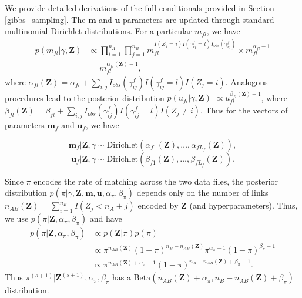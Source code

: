 \documentclass[ba]{imsart}
\begin{document}
We provide detailed derivations of the full-conditionals provided in Section \ref{gibbs_sampling}. The $\bm{m}$ and $\bm{u}$ parameters are updated through standard multinomial-Dirichlet distributions. For a particular $m_{fl}$, we have
\begin{align*}
	p(m_{fl}| \gamma, \bm{Z}) &\propto \prod_{i=1}^{n_A} \prod_{j=1}^{n_B} m_{fl}^{I(Z_j = i) I(\gamma_{ij}^f = l) I_{obs}(\gamma_{ij}^f)} \times  m_{fl}^{\alpha_{fl} - 1} \\
	&= m_{fl}^{\alpha_{fl}(\bm{Z}) - 1},
\end{align*}
where $\alpha_{fl}(\bm{Z})= \alpha_{fl} + \sum_{i,j} I_{obs}(\gamma_{ij}^f)I(\gamma_{ij}^f = l) I(Z_j = i)$. Analogous procedures lead to the posterior distribution $p(u_{fl}| \gamma, \bm{Z})$  $\propto u_{fl}^{\beta_{fl}(\bm{Z}) - 1}$, where $\beta_{fl}(\bm{Z})= \beta_{fl} + \sum_{i,j} I_{obs}(\gamma_{ij}^f)I(\gamma_{ij}^f = l) I(Z_j \neq i)$. Thus for the vectors of parameters $\bm{m}_f$ and $\bm{u}_f$, we have

$$\bm{m}_f|\bm{Z}, \gamma \sim \text{Dirichlet}(\alpha_{f1}(\bm{Z}), \ldots, \alpha_{fL_f}(\bm{Z})),$$
$$\bm{u}_f|\bm{Z}, \gamma \sim \text{Dirichlet}(\beta_{f1}(\bm{Z}), \ldots, \beta_{fL_f}(\bm{Z})).$$

Since $\pi$ encodes the rate of matching across the two data files, the posterior distribution $p(\pi|\gamma, \bm{Z}, \bm{m}, \bm{u}, \alpha_{\pi}, \beta_{\pi})$ depends only on the number of links $n_{AB}(\bm{Z}) = \sum_{i=1}^{n_B}I(Z_j < n_A + j)$ encoded by $\bm{Z}$ (and hyperparameters). Thus, we use $p(\pi | \bm{Z}, \alpha_{\pi}, \beta_{\pi})$ and have 
\begin{align*}
	p(\pi | \bm{Z}, \alpha_{\pi}, \beta_{\pi}) &\propto p(\bm{Z}|\pi)p(\pi) \\
	&\propto \pi^{n_{AB}(\bm{Z})} (1-\pi)^{n_B - n_{AB}(\bm{Z})} \pi^{\alpha_{\pi} -1} (1-\pi)^{\beta_{\pi} -1} \\
	&\propto \pi^{n_{AB}(\bm{Z}) + \alpha_{\pi} - 1} (1-\pi)^{n_A - n_{AB}(\bm{Z}) + \beta_{\pi} -1}.
\end{align*}
Thus $\pi^{(s+1)}|\bm{Z}^{(s+1)},  \alpha_{\pi}, \beta_{\pi}$ has a $\text{Beta}(n_{AB}(\bm{Z}) + \alpha_{\pi}, n_B - n_{AB}(\bm{Z}) + \beta_{\pi})$ distribution.
\end{document}
